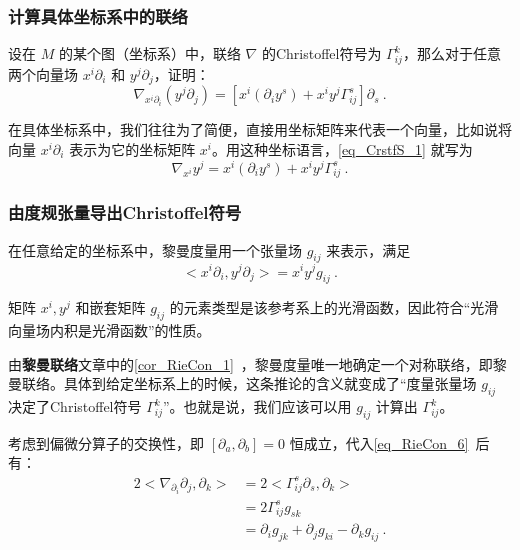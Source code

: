 \subsubsection{计算具体坐标系中的联络}

\begin{exercise}{}
设在 $M$ 的某个图（坐标系）中，联络 $\nabla$ 的Christoffel符号为 $\Gamma^k_{ij}$，那么对于任意两个向量场 $x^i\partial_i$ 和 $y^j\partial_j$，证明：
\begin{equation}\label{eq_CrstfS_1}
\nabla_{x^i\partial_i}(y^j\partial_j)=[x^i(\partial_iy^s)+x^iy^j\Gamma^s_{ij}]\partial_s~.
\end{equation}
\end{exercise}

在具体坐标系中，我们往往为了简便，直接用坐标矩阵来代表一个向量，比如说将向量 $x^i\partial_i$ 表示为它的坐标矩阵 $x^i$。用这种坐标语言，\autoref{eq_CrstfS_1} 就写为
\begin{equation}\label{eq_CrstfS_4}
\nabla_{x^i}y^j=x^i(\partial_iy^s)+x^iy^j\Gamma^s_{ij}~.
\end{equation}

\subsubsection{由度规张量导出Christoffel符号}

在任意给定的坐标系中，黎曼度量用一个张量场 $g_{ij}$ 来表示，满足
\begin{equation}
<x^i\partial_i, y^j\partial_j>=x^iy^jg_{ij}~.
\end{equation}

矩阵 $x^i, y^j$ 和嵌套矩阵 $g_{ij}$ 的元素类型是该参考系上的光滑函数，因此符合“光滑向量场内积是光滑函数”的性质。

由\textbf{黎曼联络}文章中的\autoref{cor_RieCon_1}~，黎曼度量唯一地确定一个对称联络，即黎曼联络。具体到给定坐标系上的时候，这条推论的含义就变成了“度量张量场 $g_{ij}$ 决定了Christoffel符号 $\Gamma^k_{ij}$”。也就是说，我们应该可以用 $g_{ij}$ 计算出 $\Gamma^k_{ij}$。

考虑到偏微分算子的交换性，即 $[\partial_a, \partial_b]=0$ 恒成立，代入\autoref{eq_RieCon_6}~后有：
\begin{equation}\label{eq_CrstfS_2}
\begin{aligned}
2<\nabla_{\partial_i}\partial_j, \partial_k>&=2<\Gamma^s_{ij}\partial_s, \partial_k>\\
&=2\Gamma^s_{ij}g_{sk}\\
&=\partial_ig_{jk}+\partial_jg_{ki}-\partial_kg_{ij}~.
\end{aligned}
\end{equation}

